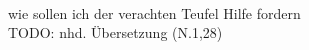 \begin{exe}
\ex \label{ex:N8091} \gll {}         \\
{wie} {sollen} {ich} {der} {verachten} {Teufel} {Hilfe} {fordern} {}\\
\glt TODO: nhd. Übersetzung (N.1,28)
\end{exe}
